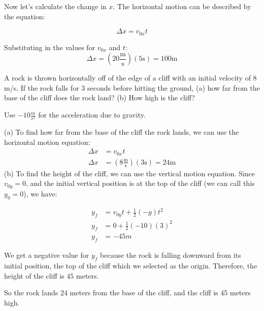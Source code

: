Now let's calculate the change in $x$.
The horizontal motion can be described by the equation:

\[
\Delta x = v_{0x} t
\]

Substituting in the values for $v_{0x}$ and $t$:
\[
\Delta x = (20 \frac{\text{m}}{\text{s}}) (5 \text{s}) = 100 \text{m}
\]

\begin{Exercise}[title=Horizontally-launched Projectile, label=projectiles_horiz1]
A rock is thrown horizontally off of the edge of a cliff with an initial velocity of $8$ m/s. If the rock falls for $3$ seconds before hitting the ground, (a) how far from the base of the cliff does the rock land? (b) How high is the cliff? 

Use $-10 \frac{m}{s^2}$ for the acceleration due to gravity.
\end{Exercise}

\begin{Answer}[ref=projectiles_horiz1]
(a) To find how far from the base of the cliff the rock lands, we can use the horizontal motion equation:
\begin{align*}
    \Delta x &= v_{0x} t\\
    \Delta x &= (8 \tfrac{\text{m}}{\text{s}})(3 \text{s}) = 24 \text{m}
\end{align*}
(b) To find the height of the cliff, we can use the vertical motion equation. Since $v_{0y} = 0$, and the initial vertical position is at the top of the cliff (we can call this $y_0 = 0$), we have:

\begin{align*}
    y_f &= v_{0y} t + \frac{1}{2} (-g) t^2 \\
    y_f &= 0 + \frac{1}{2} (-10) (3)^{2} \\
    y_f &= -45 m
\end{align*}

We get a negative value for $y_f$ because the rock is falling downward from its initial position, the top of the cliff which we selected as the origin. Therefore, the height of the cliff is $45$ meters.

So the rock lands $24$ meters from the base of the cliff, and the cliff is $45$ meters high.

\end{Answer}

